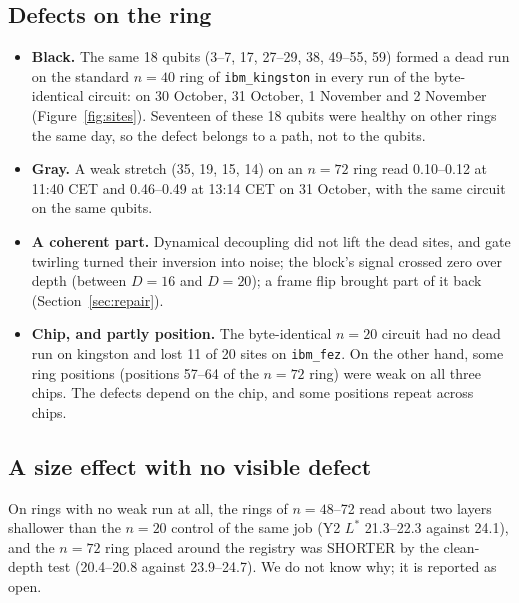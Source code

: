\documentclass[11pt]{article}
\begin{document}
\subsection{Defects on the ring}
\begin{itemize}
\item \textbf{Black.} The same 18 qubits (3--7, 17, 27--29, 38, 49--55, 59) formed a dead run on the standard $n=40$
  ring of \texttt{ibm\_kingston} in every run of the byte-identical circuit: on 30 October, 31 October, 1 November and
  2 November (Figure~\ref{fig:sites}). Seventeen of these 18 qubits were healthy on other rings the same day, so the defect
  belongs to a path, not to the qubits.
\item \textbf{Gray.} A weak stretch (35, 19, 15, 14) on an $n=72$ ring read 0.10--0.12 at 11:40 CET and 0.46--0.49 at
  13:14 CET on 31 October, with the same circuit on the same qubits.
\item \textbf{A coherent part.} Dynamical decoupling did not lift the dead sites, and gate twirling turned their
  inversion into noise; the block's signal crossed zero over depth (between $D=16$ and $D=20$); a frame flip brought
  part of it back (Section~\ref{sec:repair}).
\item \textbf{Chip, and partly position.} The byte-identical $n=20$ circuit had no dead run on kingston and lost 11 of
  20 sites on \texttt{ibm\_fez}. On the other hand, some ring positions (positions 57--64 of the $n=72$ ring) were weak
  on all three chips. The defects depend on the chip, and some positions repeat across chips.
\end{itemize}

\subsection{A size effect with no visible defect}
On rings with no weak run at all, the rings of $n=48$--72 read about two layers shallower than the $n=20$ control of
the same job (Y2 $L^*$ 21.3--22.3 against 24.1), and the $n=72$ ring placed around the registry was SHORTER by the
clean-depth test (20.4--20.8 against 23.9--24.7). We do not know why; it is reported as open.
\end{document}
